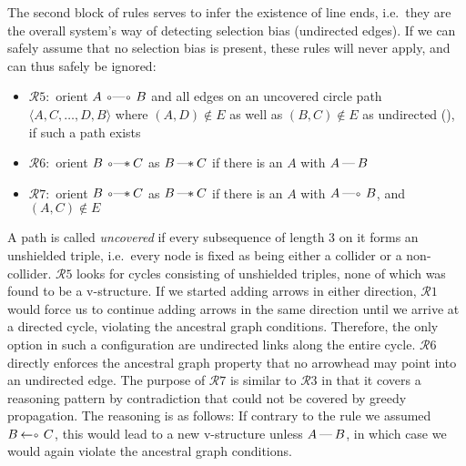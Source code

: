 The second block of rules serves to infer the existence of line ends, i.e.\ they are
the overall system's way of detecting selection bias (undirected edges). If we can safely assume that no selection bias is present, these rules will never apply, and can thus safely be ignored:
\begin{itemize}
 \item $\mathcal{R}5:$ orient $A \arrowOO B$ 
 and all edges on an uncovered circle path $\langle A,C,\dots,D,B\rangle$
 where $(A,D) \notin E$ as well as $(B,C) \notin E$ as undirected (\arrowLL), if such a path exists
 \item $\mathcal{R}6:$ orient $B \arrowOS C$  as $B \arrowLS C$ if there is an $A$ with $A \arrowLL B$
 \item $\mathcal{R}7:$ orient $B \arrowOS C$  as $B \arrowLS C$ if there is an $A$ with $A \arrowLO B$, and $(A,C) \notin E$
\end{itemize}
A path is called \textit{uncovered} if every subsequence of length 3 on it forms an unshielded triple, i.e.\ every node is fixed as being either a collider or a non-collider. $\mathcal{R}5$ looks for cycles consisting of unshielded triples, none of which was found to be a v-structure. If we started adding arrows in either direction, $\mathcal{R}1$ would force us to continue adding arrows in the same direction until we arrive at a directed cycle, violating the ancestral graph conditions. Therefore, the only option in such a configuration are undirected links along the entire cycle. $\mathcal{R}6$ directly enforces the ancestral graph property that no arrowhead may point into an undirected edge. The purpose of $\mathcal{R}7$ is similar to $\mathcal{R}3$ in that it covers a reasoning pattern by contradiction that could not be covered by greedy propagation. The reasoning is as follows: If contrary to the rule we assumed $B \arrowAS C$, this would lead to a new v-structure unless $A \arrowLL B$, in which case we 
would again violate the ancestral graph conditions.
 
